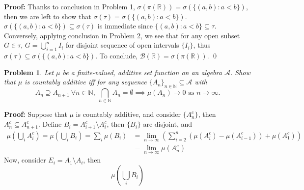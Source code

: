 \documentclass[12pt]{article}
\newtheorem{problem}{Problem}
\begin{document}
\textbf{Proof:} Thanks to conclusion in Problem 1, $\sigma(\pi(\mathbb{R}))=\sigma(\{(a, b): a<b\})$, then we are left to show that $\sigma(\tau)=\sigma(\{(a,b): a < b\})$. $\sigma(\{(a,b): a<b\})\subseteq \sigma(\tau)$ is immediate since $\{(a,b): a<b\}\subseteq \tau$. Conversely, applying conclusion in Problem 2, we see that for any open subset $G\in\tau$, $G=\bigcup_{i=1}^{n}I_i$ for disjoint sequence of open intervals $\{I_i\}$, thus $\sigma(\tau)\subseteq \sigma(\{(a, b): a<b\})$. To conclude, $\mathcal{B}(\mathbb{R})=\sigma(\pi(\mathbb{R}))$. \qed
\\
\begin{problem}
    Let $\mu$ be a finite-valued, additive set function on an algebra $\mathcal{A}$. Show that $\mu$ is countably additive iff for any sequence $\{A_n\}_{n\in\mathbb{N}}\subseteq\mathcal{A}$ with
    $$
        A_n\supseteq A_{n+1} \ \forall n\in\mathbb{N}, \ \bigcap_{n\in\mathbb{N}}A_n=\emptyset\implies \mu(A_n)\to0\text{ as } n\to\infty.
    $$
\end{problem}

\textbf{Proof:} Suppose that $\mu$ is countably additive, and consider $\{A_n^c\}$, then $A_n^c\subseteq A_{n+1}^c$. Define $B_i=A_{i+1}^c\setminus A_i^c$, then $\{B_i\}$ are disjoint, and 
\begin{align*}
    \mu\left(\bigcup_i A_{i}^c\right)=\mu\left(\bigcup_i B_i\right)=\sum\limits_i\mu\left(B_i\right)&=\lim\limits_{n\to\infty}\left(\sum\limits_{i=2}^n\left(\mu(A_i^c)-\mu(A_{i-1}^c)\right)+\mu(A_1^c)\right) \\
    &= \lim\limits_{n\to\infty} \mu(A_n^c)
\end{align*}
Now, consider $E_i=A_1\setminus A_i$, then
$$
    \mu\left(\bigcup_i B_i\right)
$$
\end{document}
